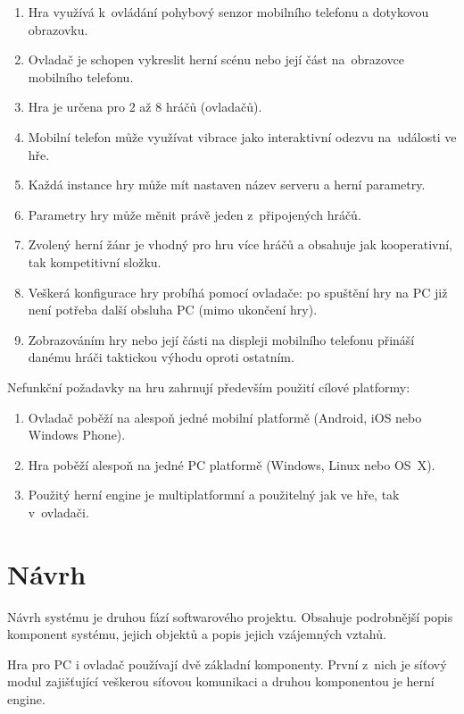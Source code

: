 \documentclass[thesis=B,czech,hidelinks]{FITthesis}[2012/06/26] %
\begin{document}
\begin{enumerate}
	\item Hra využívá k~ovládání pohybový senzor mobilního telefonu a dotykovou obrazovku.
	\item Ovladač je schopen vykreslit herní scénu nebo její část na~obrazovce mobilního telefonu.
	\item Hra je určena pro 2 až 8 hráčů (ovladačů).
	\item Mobilní telefon může využívat vibrace jako interaktivní odezvu na~události ve hře.
 	\item Každá instance hry může mít nastaven název serveru a herní parametry.
	\item Parametry hry může měnit právě jeden z~připojených hráčů.
	\item Zvolený herní žánr je vhodný pro hru více hráčů a obsahuje jak kooperativní, tak kompetitivní složku.
	\item Veškerá konfigurace hry probíhá pomocí ovladače: po spuštění hry na PC již není potřeba další obsluha PC (mimo ukončení hry).
	\item Zobrazováním hry nebo její části na displeji mobilního telefonu přináší danému hráči taktickou výhodu oproti ostatním.

\end{enumerate}

Nefunkční požadavky na hru zahrnují především použití cílové platformy:

\begin{enumerate}
	\item Ovladač poběží na alespoň jedné mobilní platformě (Android, iOS nebo Windows Phone).
	\item Hra poběží alespoň na jedné PC platformě (Windows, Linux nebo OS~X).
	\item Použitý herní engine je multiplatformní a použitelný jak ve hře, tak v~ovladači.
\end{enumerate}

\section{Návrh}

Návrh systému je druhou fází softwarového projektu. Obsahuje podrobnější popis komponent systému, jejich objektů a popis jejich vzájemných vztahů.

Hra pro PC i ovladač používají dvě základní komponenty. První z~nich je síťový modul zajišťující veškerou síťovou komunikaci a druhou komponentou je herní engine. 
\end{document}
